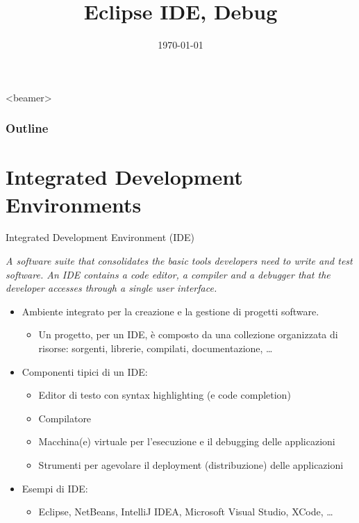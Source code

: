 \documentclass[presentation]{beamer}
\title[{\lab} -- Eclipse, Debug]{Eclipse IDE, Debug}
\date[\today]{\today}
\begin{document}
\frame[label=coverpage]{\titlepage}

\begin{frame}<beamer>
	\frametitle{Outline}
	\tableofcontents[]
\end{frame}

\section{Integrated Development Environments}

\begin{frame}{Integrated Development Environment (IDE)}
	\begin{block}{}
		\emph{A software suite that consolidates the basic tools developers need to write and test software. An IDE contains a code editor, a compiler and a debugger that the developer accesses through a single user interface.}
	\end{block}
	\begin{itemize}
		\item Ambiente integrato per la creazione e la gestione di progetti software.
		\begin{itemize}
			\item Un progetto, per un IDE, è composto da una collezione organizzata di risorse: sorgenti, librerie, compilati, documentazione, \dots
		\end{itemize}
		\item Componenti tipici di un IDE:
		\begin{itemize}
			\item Editor di testo con syntax highlighting (e code completion)
			\item Compilatore
			\item Macchina(e) virtuale per l'esecuzione e il debugging delle applicazioni
			\item Strumenti per agevolare il deployment (distribuzione) delle applicazioni
		\end{itemize}
		\item Esempi di IDE:
		\begin{itemize}
			\item Eclipse, NetBeans, IntelliJ IDEA, Microsoft Visual Studio, XCode, \dots
		\end{itemize}
	\end{itemize}
\end{frame}
\end{document}
